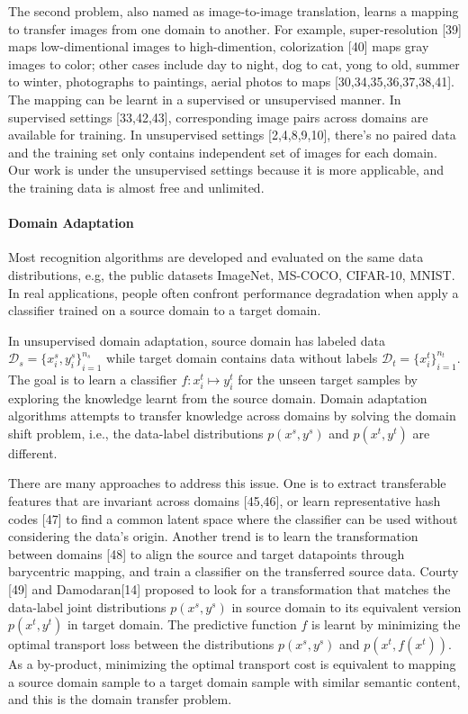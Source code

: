 \documentclass{article}
\begin{document}
The second problem, also named as image-to-image translation, learns a mapping to transfer images from one domain to another. For example, super-resolution [39] maps low-dimentional images to high-dimention, colorization [40] maps gray images to color; other cases include day to night, dog to cat, yong to old, summer to winter, photographs to paintings, aerial photos to maps [30,34,35,36,37,38,41]. The mapping can be learnt in a supervised or unsupervised manner. In supervised settings [33,42,43], corresponding image pairs across domains are available for training. In unsupervised settings [2,4,8,9,10], there's no paired data and the training set only contains independent set of images for each domain. Our work is under the unsupervised settings because it is more applicable, and the training data is almost free and unlimited. 


\paragraph{Domain Adaptation}
Most recognition algorithms are developed and evaluated on the same data distributions, e.g, the public datasets ImageNet, MS-COCO, CIFAR-10, MNIST. In real applications, people often confront performance degradation when apply a classifier trained on a source domain to a target domain.

In unsupervised domain adaptation, source domain has labeled data $\mathcal{D}_s = {\{x_i^s, y_i^s\}}_{i=1}^{n_s}$ while target domain contains data without labels $\mathcal{D}_t = {\{x_i^t\}}_{i=1}^{n_t}$. The goal is to learn a classifier $f: x_i^t \mapsto y_i^t$ for the unseen target samples by exploring the knowledge learnt from the source domain. Domain adaptation algorithms attempts to transfer knowledge across domains by solving the domain shift problem, i.e., the data-label distributions $p(x^s, y^s)$ and $p(x^t, y^t)$ are different.

There are many approaches to address this issue. One is to extract transferable features that are invariant across domains [45,46], or learn representative hash codes [47] to find a common latent space where the classifier can be used without considering the data's origin. Another trend is to learn the transformation between domains [48] to align the source and target datapoints through barycentric mapping, and train a classifier on the transferred source data. Courty [49] and Damodaran[14] proposed to look for a transformation that matches the data-label joint distributions $p(x^s, y^s)$ in source domain to its equivalent version $p(x^t, y^t)$ in target domain. The predictive function $f$ is learnt by minimizing the optimal transport loss between the distributions $p(x^s, y^s)$ and $p(x^t, f(x^t))$. As a by-product, minimizing the optimal transport cost is equivalent to mapping a source domain sample to a target domain sample with similar semantic content, and this is the domain transfer problem.
\end{document}
